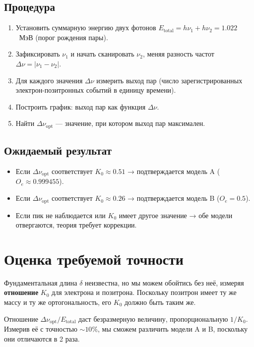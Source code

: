 \documentclass[12pt,a4paper]{article}
\begin{document}
\subsection{Процедура}
\begin{enumerate}[label=\arabic*.]
    \item Установить суммарную энергию двух фотонов $E_{\text{total}} = h\nu_1 + h\nu_2 = 1.022$~МэВ (порог рождения пары).
    \item Зафиксировать $\nu_1$ и начать сканировать $\nu_2$, меняя разность частот $\Delta\nu = |\nu_1 - \nu_2|$.
    \item Для каждого значения $\Delta\nu$ измерить выход пар (число зарегистрированных электрон-позитронных событий в единицу времени).
    \item Построить график: выход пар как функция $\Delta\nu$.
    \item Найти $\Delta\nu_{\text{opt}}$ — значение, при котором выход пар максимален.
\end{enumerate}

\subsection{Ожидаемый результат}
\begin{itemize}
    \item Если $\Delta\nu_{\text{opt}}$ соответствует $K_0 \approx 0.51$ → подтверждается модель A ($O_e \approx 0.999455$).
    \item Если $\Delta\nu_{\text{opt}}$ соответствует $K_0 \approx 0.26$ → подтверждается модель B ($O_e = 0.5$).
    \item Если пик не наблюдается или $K_0$ имеет другое значение → обе модели отвергаются, теория требует коррекции.
\end{itemize}

\section{Оценка требуемой точности}
Фундаментальная длина $\delta$ неизвестна, но мы можем обойтись без неё, измеряя \textbf{отношение} $K_0$ для электрона и позитрона. Поскольку позитрон имеет ту же массу и ту же ортогональность, его $K_0$ должно быть таким же.

Отношение $\Delta\nu_{\text{opt}} / E_{\text{total}}$ даст безразмерную величину, пропорциональную $1/K_0$. Измерив её с точностью $\sim 10\%$, мы сможем различить модели A и B, поскольку они отличаются в 2 раза.
\end{document}
